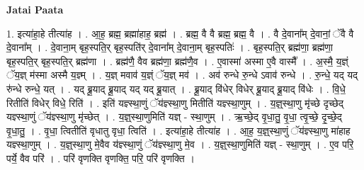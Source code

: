 \documentclass[17pt]{extarticle}
\begin{document}
\textbf{Jatai Paata} \newline

1. इत्या॑हा॒हे तीत्या॑ह । . आ॒ह॒ ब्रह्म॒ ब्रह्मा॑हाह॒ ब्रह्म॑ । . ब्रह्म॒ वै वै ब्रह्म॒ ब्रह्म॒ वै । . वै दे॒वाना᳚म् दे॒वानां॒ ॅवै वै दे॒वाना᳚म् । . दे॒वाना॒म् बृह॒स्पति॒र् बृह॒स्पति॑र् दे॒वाना᳚म् दे॒वाना॒म् बृह॒स्पतिः॑ । . बृह॒स्पति॒र् ब्रह्म॑णा॒ ब्रह्म॑णा॒ बृह॒स्पति॒र् बृह॒स्पति॒र् ब्रह्म॑णा । . ब्रह्म॑णै॒ वैव ब्रह्म॑णा॒ ब्रह्म॑णै॒व । . ए॒वास्मा॑ अस्मा ए॒वै वास्मै᳚ । . अ॒स्मै॒ य॒ज्ञ्ं ॅय॒ज्ञ् म॑स्मा अस्मै य॒ज्ञ्म् । . य॒ज्ञ् मवाव॑ य॒ज्ञ्ं ॅय॒ज्ञ् मव॑ । . अव॑ रुन्धे रु॒न्धे ऽवाव॑ रुन्धे । . रु॒न्धे॒ यद् यद् रु॑न्धे रुन्धे॒ यत् । . यद् ब्रू॒याद् ब्रू॒याद् यद् यद् ब्रू॒यात् । . ब्रू॒याद् वि॑धेर् विधेर् ब्रू॒याद् ब्रू॒याद् वि॑धेः । . वि॒धे॒ रितीति॑ विधेर् विधे॒ रिति॑ । . इति॑ यज्ञ्स्था॒णुं ॅय॑ज्ञ्स्था॒णु मितीति॑ यज्ञ्स्था॒णुम् । . य॒ज्ञ्॒स्था॒णु मृ॑च्छे दृच्छेद् यज्ञ्स्था॒णुं ॅय॑ज्ञ्स्था॒णु मृ॑च्छेत् । . य॒ज्ञ्॒स्था॒णुमिति॑ यज्ञ् - स्था॒णुम् । . ऋ॒च्छे॒द् वृ॒धा॒तु॒ वृ॒धा॒ त्वृ॒च्छे॒ दृ॒च्छे॒द् वृ॒धा॒तु॒ । . वृ॒धा॒ त्वितीति॑ वृधातु वृधा॒ त्विति॑ । . इत्या॑हा॒हे तीत्या॑ह । . आ॒ह॒ य॒ज्ञ्॒स्था॒णुं ॅय॑ज्ञ्स्था॒णु मा॑हाह यज्ञ्स्था॒णुम् । . य॒ज्ञ्॒स्था॒णु मे॒वैव य॑ज्ञ्स्था॒णुं ॅय॑ज्ञ्स्था॒णु मे॒व । . य॒ज्ञ्॒स्था॒णुमिति॑ यज्ञ् - स्था॒णुम् । . ए॒व परि॒ पर्ये॒ वैव परि॑ । . परि॑ वृणक्ति वृणक्ति॒ परि॒ परि॑ वृणक्ति । \newline
\end{document}
